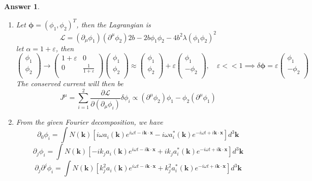 \documentclass[a4paper]{article}
\newtheorem{ans}{Answer}[section]
\theoremstyle{new}
\begin{document}
\begin{ans}
\begin{enumerate}[label=(\alph*)]
For $D^TMD=M$, we must have $\alpha^2=1$ and $1/\alpha^2=1$. But $\alpha\neq1$ (otherwise trivial), so $a=c=0$, hence
$$M=b\begin{pmatrix}0&1\\1&0\\\end{pmatrix}$$
\item Let $\boldsymbol{\phi}=(\phi_1,\phi_2)^T$, then the Lagrangian is 
$$\mathcal{L}=(\partial_\mu\phi_1)(\partial^\mu\phi_2)2b-2b\phi_1\phi_2-4b^2\lambda(\phi_1\phi_2)^2$$
let $\alpha=1+\varepsilon$, then
$$\begin{pmatrix}\phi_1\\\phi_2\\\end{pmatrix}\rightarrow\begin{pmatrix}1+\varepsilon&0\\0&\frac{1}{1+\varepsilon}\\\end{pmatrix}\begin{pmatrix}\phi_1\\\phi_2\\\end{pmatrix}\approx\begin{pmatrix}\phi_1\\\phi_2\\\end{pmatrix}+\varepsilon\begin{pmatrix}\phi_1\\-\phi_2\\\end{pmatrix},\quad\varepsilon<<1\implies\delta\boldsymbol{\phi}=\varepsilon\begin{pmatrix}\phi_1\\-\phi_2\\\end{pmatrix}$$
The conserved current will then be
$$J^\mu=\sum_{i=1}^2\frac{\partial\mathcal{L}}{\partial(\partial_\mu\phi_i)}\delta\phi_i\propto(\partial^\mu\phi_2)\phi_1-\phi_2(\partial^\mu\phi_1)$$
\item From the given Fourier decomposition, we have 
$$\partial_0\phi_i=\int N(\mathbf{k})[i\omega a_i(\mathbf{k})e^{i\omega t-i\mathbf{k}\cdot\mathbf{x}}-i\omega a_i^*(\mathbf{k})e^{-i\omega t+i\mathbf{k}\cdot\mathbf{x}}]d^3\mathbf{k}$$
$$\partial_j\phi_i=\int N(\mathbf{k})[-ik_ja_i(\mathbf{k})e^{i\omega t-i\mathbf{k}\cdot\mathbf{x}}+ik_ja_i^*(\mathbf{k})e^{-i\omega t+i\mathbf{k}\cdot\mathbf{x}}]d^3\mathbf{k}$$
$$\partial_j\partial^j\phi_i=\int N(\mathbf{k})[k_j^2a_i(\mathbf{k})e^{i\omega t-i\mathbf{k}\cdot\mathbf{x}}+k_j^2a_i^*(\mathbf{k})e^{-i\omega t+i\mathbf{k}\cdot\mathbf{x}}]d^3\mathbf{k}$$

\end{enumerate}
\end{ans}
\end{document}
